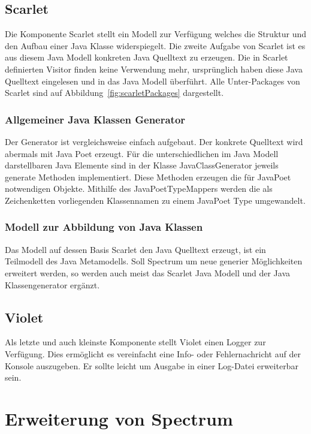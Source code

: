 \documentclass[12pt,oneside,a4paper,parskip]{scrbook}
\begin{document}
\subsection{Scarlet}

Die Komponente Scarlet stellt ein Modell zur Verfügung welches die Struktur und den Aufbau einer Java Klasse widerspiegelt. Die zweite Aufgabe von Scarlet ist es aus diesem Java Modell konkreten Java Quelltext zu erzeugen. Die in Scarlet definierten Visitor finden keine Verwendung mehr, ursprünglich haben diese Java Quelltext eingelesen und in das Java Modell überführt. Alle Unter-Packages von Scarlet sind auf Abbildung~\ref{fig:scarletPackages} dargestellt.

\subsubsection{Allgemeiner Java Klassen Generator}

Der Generator ist vergleichsweise einfach aufgebaut. Der konkrete Quelltext wird abermals mit Java Poet erzeugt. Für die unterschiedlichen im Java Modell darstellbaren Java Elemente sind in der Klasse JavaClassGenerator jeweils generate Methoden implementiert. Diese Methoden erzeugen die für JavaPoet notwendigen Objekte. Mithilfe des JavaPoetTypeMappers werden die als Zeichenketten vorliegenden Klassennamen zu einem JavaPoet Type umgewandelt.

\subsubsection{Modell zur Abbildung von Java Klassen}

Das Modell auf dessen Basis Scarlet den Java Quelltext erzeugt, ist ein Teilmodell des Java Metamodells. Soll Spectrum um neue generier Möglichkeiten erweitert werden, so werden auch meist das Scarlet Java Modell und der Java Klassengenerator ergänzt.

\subsection{Violet}

Als letzte und auch kleinste Komponente stellt Violet einen Logger zur Verfügung. Dies ermöglicht es vereinfacht eine Info- oder Fehlernachricht auf der Konsole auszugeben. Er sollte leicht um Ausgabe in einer Log-Datei erweiterbar sein.

\section{Erweiterung von Spectrum}
\end{document}
